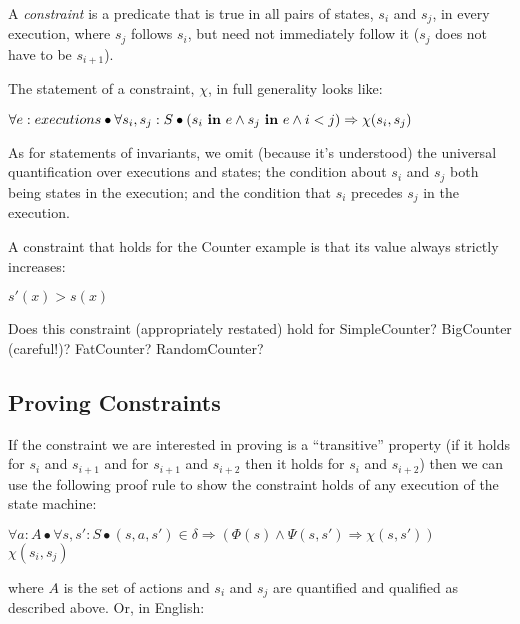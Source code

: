 A {\em constraint} is a predicate that is true in all pairs of states,
$s_i$ and $s_j$, in every execution, where $s_j$
follows $s_i$, but need not immediately follow it ($s_j$ does not have
to be $s_{i+1}$).

The statement of a constraint, $\chi$, in full generality looks like:

\begin{center}
$\forall e: executions \bullet \forall s_i, s_j: S \bullet (s_i ~{\bf in}~ e \wedge s_j ~{\bf in}~ e \wedge i < j) \Rightarrow \chi(s_i, s_j)$
\end{center}

\noindent As for statements of invariants, we omit (because it's
understood) the
universal
quantification over executions and states; the condition about $s_i$
and $s_j$ both being states in the execution; and the condition that $s_i$
precedes $s_j$ in the execution.

A constraint that holds for the Counter example
is that its value always strictly increases:

\begin{center}
$s'(x) > s(x)$
\end{center}

Does this constraint (appropriately restated) hold for SimpleCounter?
BigCounter (careful!)? FatCounter?  RandomCounter?

\subsection{Proving Constraints}
If the constraint we are interested in proving is a ``transitive'' property
(if it holds for $s_i$ and $s_{i+1}$ and for $s_{i+1}$ and $s_{i+2}$
then it holds for $s_i$ and $s_{i+2}$) then
we can use the following proof rule to show the constraint holds
of any execution of the state machine:

\begin{center}
\underline{$\forall a: A \bullet \forall s, s': S \bullet (s, a, s') \in \delta
\Rightarrow ( \Phi(s) \wedge \Psi(s,s') \Rightarrow \chi(s, s') )$}\\
$\chi(s_i, s_j)$
\end{center}

\noindent where $A$ is the set of actions and $s_i$ and $s_j$ are quantified and qualified as
described
above.  Or, in English:

